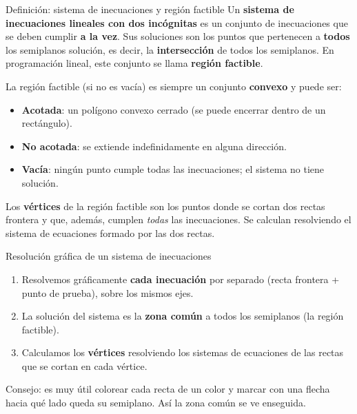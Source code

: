 \documentclass[11pt,a4paper]{article}
\newcommand{\fmbadge}[2]{\tcbox[on line,colback=#1,colframe=#1,arc=2mm,boxsep=0pt,left=4pt,right=4pt,top=1.5pt,bottom=1.5pt]{\color{white}\footnotesize\bfseries #2}}
\begin{document}
\begin{fmdef}{Definición: sistema de inecuaciones y región factible}
Un \textbf{sistema de inecuaciones lineales con dos incógnitas} es un conjunto de inecuaciones que se deben cumplir \textbf{a la vez}. Sus soluciones son los puntos que pertenecen a \textbf{todos} los semiplanos solución, es decir, la \textbf{intersección} de todos los semiplanos. En programación lineal, este conjunto se llama \textbf{región factible}.

La región factible (si no es vacía) es siempre un conjunto \textbf{convexo} y puede ser:

\begin{itemize}
\item \fmbadge{fmok}{$\bullet$} \textbf{Acotada}: un polígono convexo cerrado (se puede encerrar dentro de un rectángulo).
\item \fmbadge{fmsf}{$\bullet$} \textbf{No acotada}: se extiende indefinidamente en alguna dirección.
\item \fmbadge{fmas}{$\bullet$} \textbf{Vacía}: ningún punto cumple todas las inecuaciones; el sistema no tiene solución.
\end{itemize}

Los \textbf{vértices} de la región factible son los puntos donde se cortan dos rectas frontera y que, además, cumplen \emph{todas} las inecuaciones. Se calculan resolviendo el sistema de ecuaciones formado por las dos rectas.
\end{fmdef}

\begin{fmdef}{Resolución gráfica de un sistema de inecuaciones}
\begin{enumerate}
\item Resolvemos gráficamente \textbf{cada inecuación} por separado (recta frontera + punto de prueba), sobre los mismos ejes.
\item La solución del sistema es la \textbf{zona común} a todos los semiplanos (la región factible).
\item Calculamos los \textbf{vértices} resolviendo los sistemas de ecuaciones de las rectas que se cortan en cada vértice.
\end{enumerate}

\begin{fmnote}Consejo: es muy útil colorear cada recta de un color y marcar con una flecha hacia qué lado queda su semiplano. Así la zona común se ve enseguida.\end{fmnote}
\end{fmdef}
\end{document}
